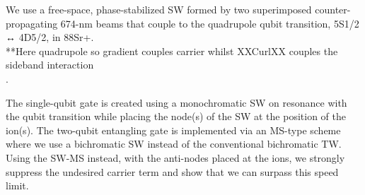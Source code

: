 \documentclass[12pt]{iopart}
\begin{document}
    We use a free-space, phase-stabilized SW formed by two
    superimposed counter-propagating 674-nm beams that couple to the
    quadrupole qubit transition, 5S1/2 ↔ 4D5/2, in 88Sr+.\\

    **Here quadrupole so gradient couples carrier whilst XXCurlXX couples the sideband interaction\\.

    The single-qubit gate is created using a monochromatic SW on
    resonance with the qubit transition while placing the node(s) of
    the SW at the position of the ion(s). The two-qubit entangling gate
    is implemented via an MS-type scheme where we use a bichromatic SW
    instead of the conventional bichromatic TW.\\

    Using the
    SW-MS instead, with the anti-nodes placed at the ions, we strongly
    suppress the undesired carrier term and show that we can surpass
    this speed limit.\\



\end{document}
